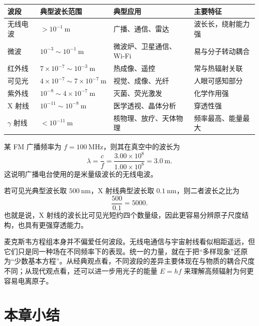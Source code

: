 \begin{center}
\renewcommand{\arraystretch}{1.25}
\begin{tabular}{p{3cm}p{3.7cm}p{4.8cm}p{3.2cm}}
\toprule
波段 & 典型波长范围 & 典型应用 & 主要特征 \\
\midrule
无线电波 & $>10^{-1}\ \text{m}$ & 广播、通信、雷达 & 波长长，绕射能力强 \\
微波 & $10^{-3}\sim10^{-1}\ \text{m}$ & 微波炉、卫星通信、Wi-Fi & 易与分子转动耦合 \\
红外线 & $7\times10^{-7}\sim10^{-3}\ \text{m}$ & 热成像、遥控 & 常与热辐射关联 \\
可见光 & $4\times10^{-7}\sim7\times10^{-7}\ \text{m}$ & 视觉、成像、光纤 & 人眼可感知部分 \\
紫外线 & $10^{-8}\sim4\times10^{-7}\ \text{m}$ & 灭菌、荧光激发 & 化学作用强 \\
X 射线 & $10^{-11}\sim10^{-8}\ \text{m}$ & 医学透视、晶体分析 & 穿透性强 \\
$\gamma$ 射线 & $<10^{-11}\ \text{m}$ & 核物理、放疗、天体物理 & 频率最高、能量最大 \\
\bottomrule
\end{tabular}
\end{center}

\begin{example}[由频率求波长]
某 FM 广播频率为 $f=100\ \text{MHz}$，则其在真空中的波长为
\[
\lambda=\frac{c}{f}=\frac{3.00\times 10^8}{1.00\times10^8}=3.0\ \text{m}.
\]
这说明广播电台使用的是米量级波长的无线电波。
\end{example}

若可见光典型波长取 $500\ \text{nm}$，X 射线典型波长取 $0.1\ \text{nm}$，则二者波长之比为
\[
\frac{500}{0.1}=5000.
\]
也就是说，X 射线的波长比可见光短约四个数量级，因此更容易分辨原子尺度结构，也具有更强穿透能力。

\begin{remark}
麦克斯韦方程组本身并不偏爱任何波段。无线电通信与宇宙射线看似相距遥远，但它们只是同一种场在不同频率下的表现。统一的力量，就在于把“多样现象”还原为“少数基本方程”。从经典观点看，不同波段的差异主要体现在与物质的耦合尺度不同；从现代观点看，还可以进一步用光子的能量 $E=hf$ 来理解高频辐射为何更容易电离原子。
\end{remark}

\section*{本章小结}

